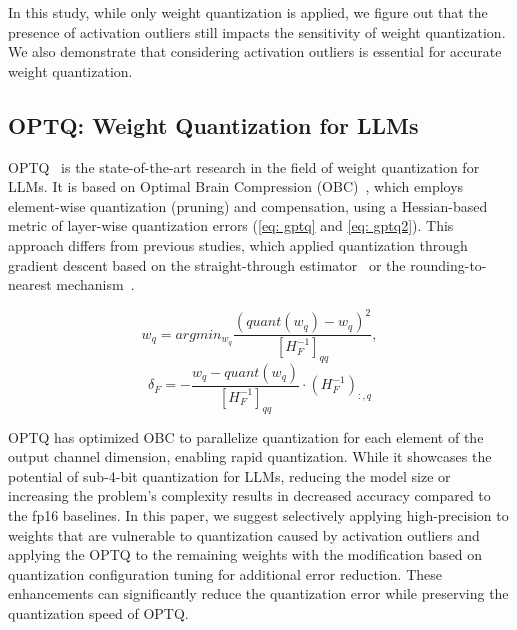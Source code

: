 \documentclass[letterpaper]{article} %
\begin{document}
In this study, while only weight quantization is applied, we figure out that the presence of activation outliers still impacts the sensitivity of weight quantization. We also demonstrate that considering activation outliers is essential for accurate weight quantization.

\subsection{OPTQ: Weight Quantization for LLMs}
OPTQ~\cite{frantar2023optq} is the state-of-the-art research in the field of weight quantization for LLMs. It is based on Optimal Brain Compression (OBC)~\cite{frantaroptimal}, which employs element-wise quantization (pruning) and compensation, using a Hessian-based metric of layer-wise quantization errors (\cref{eq: gptq} and \cref{eq: gptq2}). This approach differs from previous studies, which applied quantization through gradient descent based on the straight-through estimator~\cite{librecq,weiqdrop} or the rounding-to-nearest mechanism~\cite{dettmers2022llm}.

\begin{equation}
\label{eq: gptq}
    w_q = argmin_{w_q} \frac{(quant(w_q)-w_q)^2}{[H_F^{-1}]_{qq}},
\end{equation}
\begin{equation}
\label{eq: gptq2}
    \delta _F = - \frac{w_q - quant(w_q)}{[H_F^{-1}]_{qq}} \cdot (H_F^{-1})_{:,q}
\end{equation}

OPTQ has optimized OBC to parallelize quantization for each element of the output channel dimension, enabling rapid quantization. While it showcases the potential of sub-4-bit quantization for LLMs, reducing the model size or increasing the problem's complexity results in decreased accuracy compared to the fp16 baselines. In this paper, we suggest selectively applying high-precision to weights that are vulnerable to quantization caused by activation outliers and applying the OPTQ to the remaining weights with the modification based on quantization configuration tuning for additional error reduction. These enhancements can significantly reduce the quantization error while preserving the quantization speed of OPTQ.
\end{document}
